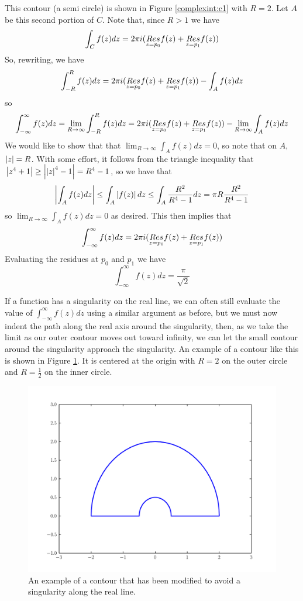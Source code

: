 This contour (a semi circle) is shown in Figure \ref{complexint:c1} with $R = 2$.
Let $A$ be this second portion of $C$.
Note that, since $R>1$ we have
\[\int_C f(z)dz = 2\pi i (\underset{z=p_0}{Res} f(z) +\underset{z=p_1}{Res} f(z))\]
So, rewriting, we have
\[\int_{-R}^R f(z) dz = 2\pi i (\underset{z=p_0}{Res} f(z) +\underset{z=p_1}{Res} f(z)) - \int_A f(z) dz\]
so
\[\int_{-\infty}^{\infty} f(z) dz = \lim_{R\to \infty} \int_{-R}^R f(z) dz = 2\pi i (\underset{z=p_0}{Res} f(z) +\underset{z=p_1}{Res} f(z)) - \lim_{R\to \infty} \int_A f(z) dz\]
We would like to show that that $\lim_{R\to\infty} \int_A f(z) dz = 0$, so note that on $A$, $\left\lvert z\right\rvert=R$.
With some effort, it follows from the triangle inequality that $\left\lvert z^4+1\right\rvert\geq \left\lvert\left\lvert z\right\rvert^4-1\right\rvert = R^4 -1$, so we have that
\[\left\lvert\int_A f(z) dz\right\rvert\leq \int_A \left\lvert f(z)\right\rvert dz \leq \int_A \frac{R^2}{R^4 -1}dz = \pi R \frac{R^2}{R^4-1}\]
so $\lim_{R\to\infty} \int_A f(z) dz = 0$ as desired.
This then implies that
\[\int_{-\infty}^{\infty} f(z) dz = 2\pi i (\underset{z=p_0}{Res} f(z) +\underset{z=p_1}{Res} f(z))\]
Evaluating the residues at $p_0$ and $p_1$ we have
\[\int_{-\infty}^{\infty} f(z) dz = \frac{\pi}{\sqrt{2}}\]

If a function has a singularity on the real line, we can often still evaluate the value of $\int_{-\infty}^{\infty} f(z) dz$ using a similar argument as before, but we must now indent the path along the real axis around the singularity, then, as we take the limit as our outer contour moves out toward infinity, we can let the small contour around the singularity approach the singularity.
An example of a contour like this is shown in Figure \ref{complexint:c2}.
It is centered at the origin with $R=2$ on the outer circle and $R=\frac{1}{2}$ on the inner circle.

\begin{figure}
\includegraphics[width=\textwidth]{contour2.pdf}
\caption{An example of a contour that has been modified to avoid a singularity along the real line.}
\label{complexint:c2}
\end{figure}

